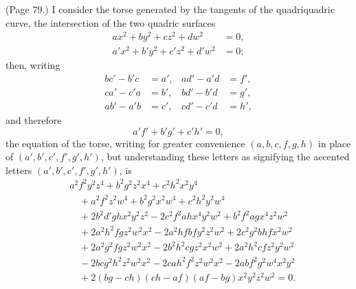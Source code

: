 \documentclass[11pt,a4paper]{article}
\begin{document}
\medskip

\noindent (Page 79.) I consider the torse generated by the tangents of the quadriquadric curve, the intersection of the two quadric surfaces
\begin{align*}
ax^2 + by^2 + cz^2 + dw^2 &= 0, \\
a'x^2 + b'y^2 + c'z^2 + d'w^2 &= 0;
\end{align*}
then, writing
\begin{align*}
bc' - b'c &= a', & ad' - a'd &= f', \\
ca' - c'a &= b', & bd' - b'd &= g', \\
ab' - a'b &= c', & cd' - c'd &= h',
\end{align*}
and therefore
\[
a'f' + b'g' + c'h' = 0,
\]
the equation of the torse, writing for greater convenience $(a, b, c, f, g, h)$ in place of $(a', b', c', f', g', h')$, but understanding these letters as signifying the accented letters $(a', b', c', f', g', h')$, is
\begin{align*}
&a^2 f^2 y^2 z^4 + b^2 g^2 z^2 x^4 + c^2 h^2 x^2 y^4 \\
&\quad + a^2 f^2 z^2 w^4 + b^2 g^2 x^2 w^4 + c^2 h^2 y^2 w^4 \\
&\quad + 2b^2 d' gh x^2 y^2 z^2 - 2c^2 f^2 ah x^4 y^2 w^2 + b^2 f^2 ag x^4 z^2 w^2 \\
&\quad + 2a^2 h^2 fg z^2 w^2 x^2 - 2a^2 hf bf y^2 z^2 w^2 + 2c^2 g^2 bh f x^2 w^2 \\
&\quad + 2a^2 g^2 fg z^2 w^2 x^2 - 2b^2 h^2 cg z^2 x^2 w^2 + 2a^2 h^2 cf z^2 y^2 w^2 \\
&\quad - 2bcg^2 h^2 z^2 w^2 x^2 - 2cah^2 f^2 z^2 w^2 x^2 - 2abf^2 g^2 w^4 x^2 y^2 \\
&\quad + 2(bg - ch)(ch - af)(af - bg) x^2 y^2 z^2 w^2 = 0.
\end{align*}

\bigskip
\end{document}
